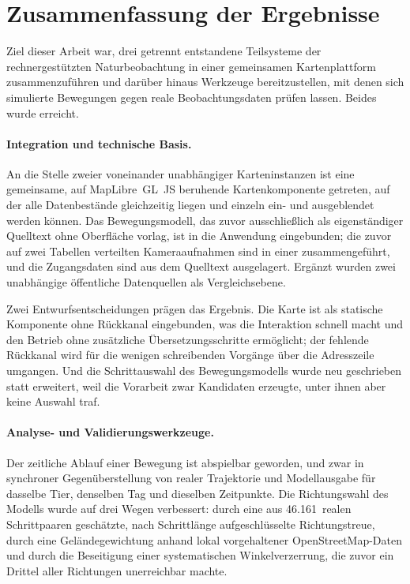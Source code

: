\documentclass[12pt,a4paper]{report}
\begin{document}
\section{Zusammenfassung der Ergebnisse}
\label{sec:zusammenfassung}

Ziel dieser Arbeit war, drei getrennt entstandene Teilsysteme der rechnergestützten
Naturbeobachtung in einer gemeinsamen Kartenplattform zusammenzuführen und darüber hinaus
Werkzeuge bereitzustellen, mit denen sich simulierte Bewegungen gegen reale Beobachtungsdaten
prüfen lassen. Beides wurde erreicht.

\paragraph{Integration und technische Basis.} An die Stelle zweier voneinander unabhängiger
Karteninstanzen ist eine gemeinsame, auf MapLibre~GL~JS beruhende Kartenkomponente getreten,
auf der alle Datenbestände gleichzeitig liegen und einzeln ein- und ausgeblendet werden
können. Das Bewegungsmodell, das zuvor ausschließlich als eigenständiger Quelltext ohne
Oberfläche vorlag, ist in die Anwendung eingebunden; die zuvor auf zwei Tabellen verteilten
Kameraaufnahmen sind in einer zusammengeführt, und die Zugangsdaten sind aus dem Quelltext
ausgelagert. Ergänzt wurden zwei unabhängige öffentliche Datenquellen als Vergleichsebene.

Zwei Entwurfsentscheidungen prägen das Ergebnis. Die Karte ist als statische Komponente ohne
Rückkanal eingebunden, was die Interaktion schnell macht und den Betrieb ohne zusätzliche
Übersetzungsschritte ermöglicht; der fehlende Rückkanal wird für die wenigen schreibenden
Vorgänge über die Adresszeile umgangen. Und die Schrittauswahl des Bewegungsmodells wurde
neu geschrieben statt erweitert, weil die Vorarbeit zwar Kandidaten erzeugte, unter ihnen
aber keine Auswahl traf.

\paragraph{Analyse- und Validierungswerkzeuge.} Der zeitliche Ablauf einer Bewegung ist
abspielbar geworden, und zwar in synchroner Gegenüberstellung von realer Trajektorie und
Modellausgabe für dasselbe Tier, denselben Tag und dieselben Zeitpunkte. Die Richtungswahl
des Modells wurde auf drei Wegen verbessert: durch eine aus 46.161~realen Schrittpaaren
geschätzte, nach Schrittlänge aufgeschlüsselte Richtungstreue, durch eine Geländegewichtung
anhand lokal vorgehaltener OpenStreetMap-Daten und durch die Beseitigung einer systematischen
Winkelverzerrung, die zuvor ein Drittel aller Richtungen unerreichbar machte.
\end{document}

